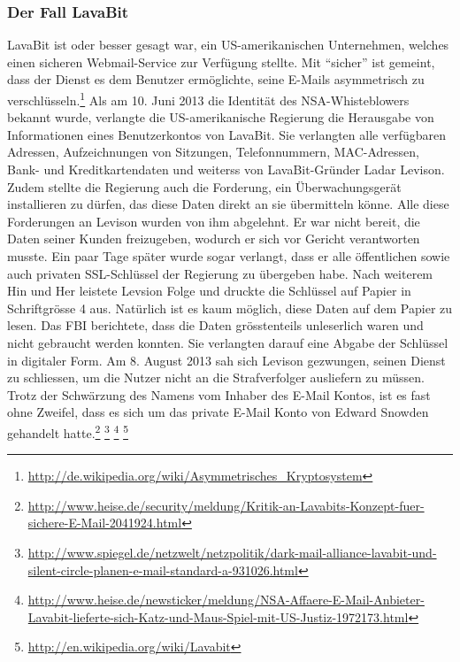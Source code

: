 \subsubsection{Der Fall LavaBit}
LavaBit ist oder besser gesagt war, ein US-amerikanischen Unternehmen, welches einen sicheren Webmail-Service zur Verfügung stellte.
Mit ``sicher'' ist gemeint, dass der Dienst es dem Benutzer ermöglichte, seine E-Mails asymmetrisch zu verschlüsseln.\footnote{\url{http://de.wikipedia.org/wiki/Asymmetrisches_Kryptosystem}}
Als am 10. Juni 2013 die Identität des NSA-Whisteblowers bekannt wurde, verlangte die US-amerikanische Regierung die Herausgabe von Informationen eines Benutzerkontos von LavaBit.
Sie verlangten alle verfügbaren Adressen, Aufzeichnungen von Sitzungen, Telefonnummern, MAC-Adressen, Bank- und Kreditkartendaten und weiterss von LavaBit-Gründer Ladar Levison. Zudem stellte die Regierung auch die Forderung, ein Überwachungsgerät installieren zu dürfen, das diese Daten direkt an sie übermitteln könne. Alle diese Forderungen an Levison wurden von ihm abgelehnt. Er war nicht bereit, die Daten seiner Kunden freizugeben, wodurch er sich vor Gericht verantworten musste.
Ein paar Tage später wurde sogar verlangt, dass er alle öffentlichen sowie auch privaten SSL-Schlüssel der Regierung zu übergeben habe. Nach weiterem Hin und Her leistete Levsion Folge und druckte die Schlüssel auf Papier in Schriftgrösse 4 aus. Natürlich ist es kaum möglich, diese Daten auf dem Papier zu lesen. Das FBI berichtete, dass die Daten grösstenteils unleserlich waren und nicht gebraucht werden konnten. Sie verlangten darauf eine Abgabe der Schlüssel in digitaler Form.
Am 8. August 2013 sah sich Levison gezwungen, seinen Dienst zu schliessen, um die Nutzer nicht an die Strafverfolger ausliefern zu müssen.
Trotz der Schwärzung des Namens vom Inhaber des E-Mail Kontos, ist es fast ohne Zweifel, dass es sich um das private E-Mail Konto von Edward Snowden gehandelt hatte.\footnote{\url{http://www.heise.de/security/meldung/Kritik-an-Lavabits-Konzept-fuer-sichere-E-Mail-2041924.html}}
\footnote{\url{http://www.spiegel.de/netzwelt/netzpolitik/dark-mail-alliance-lavabit-und-silent-circle-planen-e-mail-standard-a-931026.html}}
\footnote{\url{http://www.heise.de/newsticker/meldung/NSA-Affaere-E-Mail-Anbieter-Lavabit-lieferte-sich-Katz-und-Maus-Spiel-mit-US-Justiz-1972173.html}}
\footnote{\url{http://en.wikipedia.org/wiki/Lavabit}}

